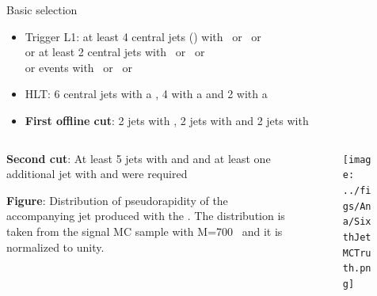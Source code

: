 \begin{frame}{Basic selection}
\vspace{-.2cm}

\begin{block}{}
  \begin{itemize}\scriptsize
  \item Trigger L1: at least 4 central jets () with ~or ~or  \\
                    or at least 2 central jets with ~or ~or  \\
                    or events with ~or ~or 
  \item HLT: 6 central jets with a , 4 with a  and 2 with a 
  \item \textbf{First offline cut}: 2 jets with , 2 jets with  and 2 jets with 
  \end{itemize}
\end{block}

\begin{columns}
\begin{column}{.50\textwidth}
\vspace{-.2cm}
\begin{block}{}
  \scriptsize \textbf{Second cut}: At least 5 jets with  and  and at least one additional jet with  and  were required
\end{block}

\vspace{-.2cm}
\begin{block}{}
\scriptsize \textbf{Figure}: Distribution of pseudorapidity of the accompanying jet produced with the \Tp. The distribution is taken from the signal MC sample with M=700 \GeVcc~and it is normalized to unity.
\end{block}
\end{column}

\begin{column}{.50\textwidth}
\vspace{-.2cm}
\begin{figure}[!Hhtbp]
  \begin{center}
    \texttt{[image: ../figs/Ana/SixthJetMCTruth.png]}
  \end{center}
\end{figure}
\end{column}
\end{columns}

\end{frame}